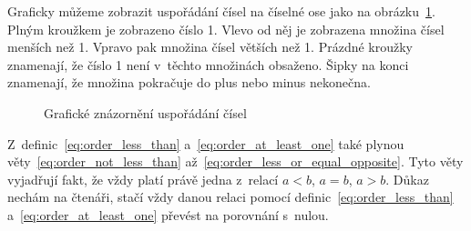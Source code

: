 Graficky můžeme zobrazit uspořádání čísel na číselné ose jako na obrázku~\ref{img:ordering}. Plným kroužkem je zobrazeno číslo 1. Vlevo od něj je zobrazena množina čísel menších než 1. Vpravo pak množina čísel větších než 1. Prázdné kroužky znamenají, že číslo 1 není v~těchto množinách obsaženo. Šipky na konci znamenají, že množina pokračuje do plus nebo minus nekonečna. 

\begin{figure}[!h]
\centering
{}
\caption{Grafické znázornění uspořádání čísel}
\label{img:ordering}
\end{figure}

Z~definic~\eqref{eq:order_less_than} a~\eqref{eq:order_at_least_one} také plynou věty~\eqref{eq:order_not_less_than} až~\eqref{eq:order_less_or_equal_opposite}. Tyto věty vyjadřují fakt, že vždy platí právě jedna z~relací \(a < b\), \(a = b\), \(a > b\). Důkaz nechám na čtenáři, stačí vždy danou relaci pomocí definic~\eqref{eq:order_less_than} a~\eqref{eq:order_at_least_one} převést na porovnání s~nulou.


